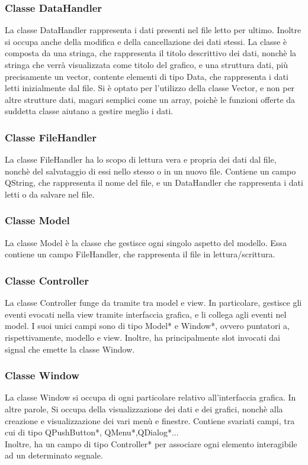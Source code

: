 \documentclass[10pt]{article}
\begin{document}
    \subsubsection{Classe DataHandler}
    La classe DataHandler rappresenta i dati presenti nel file letto per ultimo. Inoltre si occupa anche della modifica e della cancellazione dei dati stessi.
    La classe è composta da una stringa, che rappresenta il titolo descrittivo dei dati, nonchè la stringa che verrà visualizzata come titolo del grafico, e una struttura dati, più precisamente un vector, contente elementi di tipo Data, che rappresenta i dati letti inizialmente dal file.
    Si è optato per l'utilizzo della classe Vector, e non per altre strutture dati, magari semplici come un array, poichè le funzioni offerte da suddetta classe aiutano a gestire meglio i dati.
    \subsubsection{Classe FileHandler}
    La classe FileHandler ha lo scopo di lettura vera e propria dei dati dal file, nonchè del salvataggio di essi nello stesso o in un nuovo file. Contiene un campo QString, che rappresenta il nome del file, e un DataHandler che rappresenta i dati letti o da salvare nel file.
    \subsubsection{Classe Model}
    La classe Model è la classe che gestisce ogni singolo aspetto del modello. Essa contiene un campo FileHandler, che rappresenta  il file in lettura/scrittura.
    \subsubsection{Classe Controller}
    La classe Controller funge da tramite tra model e view. In particolare, gestisce gli eventi evocati nella view tramite interfaccia grafica, e li collega agli eventi nel model. I suoi unici campi sono di tipo Model* e Window*, ovvero puntatori a, rispettivamente, modello e view. Inoltre, ha principalmente slot invocati dai signal che emette la classe Window.
    \subsubsection{Classe Window}
    La classe Window si occupa di ogni particolare relativo all'interfaccia grafica. In altre parole, Si occupa della visualizzazione dei dati e dei grafici, nonchè alla creazione e visualizzazione dei vari menù e finestre. Contiene svariati campi, tra cui di tipo QPushButton*, QMenu*,QDialog*...\\Inoltre, ha un campo di tipo Controller* per associare ogni elemento interagibile ad un determinato segnale.
\end{document}
